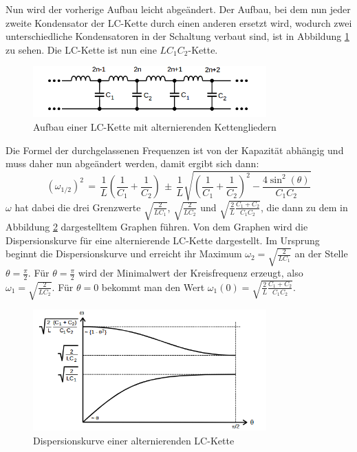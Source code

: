 \documentclass[
  bibliography=totoc,     %
  captions=tableheading,  %
  titlepage=firstiscover, %
]{scrartcl}
\begin{document}
Nun wird der vorherige Aufbau leicht abgeändert. Der Aufbau, bei dem nun jeder
zweite Kondensator der LC-Kette durch einen anderen ersetzt wird, wodurch
zwei unterschiedliche Kondensatoren in der Schaltung verbaut sind, ist in
Abbildung \ref{fig:V3565} zu sehen. Die LC-Kette ist nun eine $LC_1C_2$-Kette.
\begin{figure}[htb]
  \centering
  \includegraphics[width=0.8\textwidth]{V3565.png}
  \caption{Aufbau einer LC-Kette mit alternierenden Kettengliedern}
  \label{fig:V3565}
\end{figure}
Die Formel der durchgelassenen Frequenzen ist von der Kapazität abhängig und muss
daher nun abgeändert werden, damit ergibt sich dann:
\begin{equation}
  (\omega_{1/2})^2\,=\,\frac{1}{L}\left(\frac{1}{C_1}+\frac{1}{C_2}\right)\,\pm\,\frac{1}{L}\sqrt{\left(\frac{1}{C_1}+\frac{1}{C_2}\right)^2-\frac{4\sin^2(\theta)}{C_1C_2}}
\label{husoformel}
\end{equation}
$\omega$ hat dabei die drei Grenzwerte $\sqrt{\frac{2}{LC_1}}$,
$\sqrt{\frac{2}{LC_2}}$ und $\sqrt{\frac{2}{L}\frac{C_1+C_2}{C_1C_2}}$, die
dann zu dem in Abbildung \ref{fig:V3564} dargestelltem Graphen führen. Von dem
Graphen wird die Dispersionskurve für eine alternierende LC-Kette dargestellt.
Im Ursprung beginnt die Dispersionskurve und erreicht ihr Maximum
$\omega_2=\sqrt{\frac{2}{LC_1}}$ an der Stelle $\theta=\frac{\pi}{2}$.
Für $\theta=\frac{\pi}{2}$ wird der Minimalwert der Kreisfrequenz erzeugt,
also $\omega_1=\sqrt{\frac{2}{LC_2}}$.
Für $\theta=0$ bekommt man den Wert $\omega_1(0)=\sqrt{\frac{2}{L}\frac{C_1+C_2}{C_1C_2}}$.
\begin{figure}[htb]
  \centering
  \includegraphics[width=0.8\textwidth]{V3564.png}
  \caption{Dispersionskurve einer alternierenden LC-Kette}
  \label{fig:V3564}
\end{figure}
\end{document}
